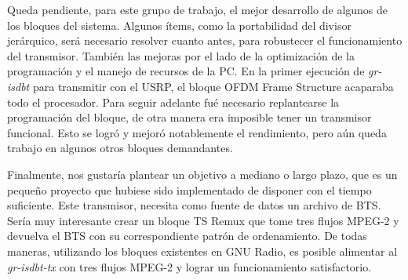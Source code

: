 Queda pendiente, para este grupo de trabajo, el mejor desarrollo de algunos de los bloques del sistema. Algunos ítems, como la portabilidad del divisor jerárquico, será necesario resolver cuanto antes, para robustecer el funcionamiento del transmisor. También las mejoras por el lado de la optimización de la programación y el manejo de recursos de la PC. En la primer ejecución de \textit{gr-isdbt} para transmitir con el USRP, el bloque OFDM Frame Structure acaparaba todo el procesador. Para seguir adelante fué necesario replantearse la programación del bloque, de otra manera era imposible tener un transmisor funcional. Esto se logró y mejoró notablemente el rendimiento, pero aún queda trabajo en algunos otros bloques demandantes.

Finalmente, nos gustaría plantear un objetivo a mediano o largo plazo, que es un pequeño proyecto que hubiese sido implementado de disponer con el tiempo suficiente. Este transmisor, necesita como fuente de datos un archivo de BTS. Sería muy interesante crear un bloque TS Remux que tome tres flujos MPEG-2 y devuelva el BTS con su correspondiente patrón de ordenamiento. De todas maneras, utilizando los bloques existentes en GNU Radio, es posible alimentar al \textit{gr-isdbt-tx} con tres flujos MPEG-2 y lograr un funcionamiento satisfactorio.